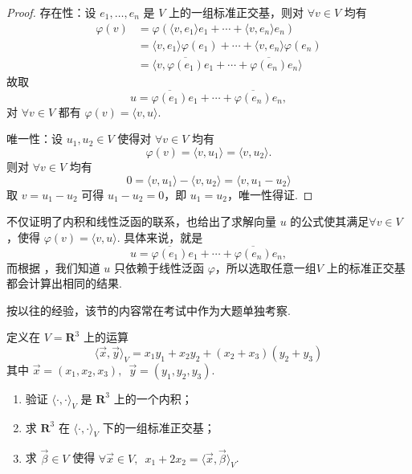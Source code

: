 \begin{proof}
    存在性：设 $e_1, \ldots , e_n$ 是 $ V $ 上的一组标准正交基，则对 $\forall v \in V $ 均有
    \begin{align*}
        \varphi (v) & = \varphi(\langle v, e_1 \rangle e_1 + \cdots + \langle v, e_n \rangle e_n )           \\
                    & = \langle v, e_1 \rangle \varphi (e_1) + \cdots + \langle v, e_n \rangle \varphi (e_n) \\
                    & = \langle v, \overline{\varphi(e_1)}e_1 + \cdots + \overline{\varphi(e_n)}e_n \rangle
    \end{align*}
    故取
    \[ u = \overline{\varphi(e_1)}e_1 + \cdots + \overline{\varphi(e_n)}e_n, \]
    对 $\forall v \in V$ 都有 $\varphi(v) = \langle v, u \rangle $.

    唯一性：设 $ u_1, u_2 \in V $ 使得对 $\forall v \in V $ 均有
    \[\varphi(v) = \langle v, u_1 \rangle = \langle v, u_2 \rangle.\]
    则对 $\forall v \in V $ 均有
    \[ 0 = \langle v, u_1 \rangle - \langle v, u_2 \rangle = \langle v, u_1 - u_2 \rangle\]
    取 $ v = u_1 - u_2 $ 可得 $ u_1 - u_2 = 0 $，即 $ u_1 = u_2 $，唯一性得证.
\end{proof}

不仅证明了内积和线性泛函的联系，也给出了求解向量 $ u $ 的公式使其满足$ \forall v \in V $，使得 $ \varphi(v) = \langle v, u\rangle $. 具体来说，就是
\[ u = \overline{\varphi(e_1)}e_1 + \cdots + \overline{\varphi(e_n)}e_n, \]
而根据 ，我们知道 $ u $ 只依赖于线性泛函 $ \varphi $，所以选取任意一组$ V $ 上的标准正交基都会计算出相同的结果.

按以往的经验，该节的内容常在考试中作为大题单独考察.
\begin{example}{}{}
    定义在 $ V = \mathbf{R}^3 $ 上的运算
    \[ \langle \vec{x}, \vec{y} \rangle_V = x_1 y_1 + x_2 y_2 + (x_2 + x_3)(y_2 + y_3) \]
    其中 $ \vec{x} = (x_1, x_2, x_3),\enspace \vec{y} = (y_1, y_2, y_3) $.
    \begin{enumerate}
        \item 验证 $ \langle \cdot, \cdot \rangle_V $ 是 $ \mathbf{R}^3 $ 上的一个内积；

        \item 求 $ \mathbf{R}^3 $ 在 $ \langle \cdot, \cdot \rangle_V $ 下的一组标准正交基；

        \item 求 $ \vec{\beta} \in V $ 使得 $ \forall \vec{x} \in V,\enspace x_1 + 2x_2 = \langle \vec{x}, \vec{\beta} \rangle_V $.
    \end{enumerate}
\end{example}

